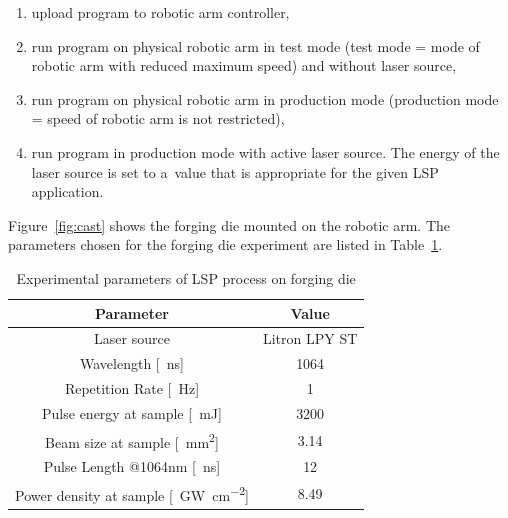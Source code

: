 \begin{enumerate}
    
\item upload program to robotic arm controller,

\item run program on physical robotic arm in test mode (test mode = mode of robotic arm with reduced maximum speed) and without laser source,

\item run program on physical robotic arm in production mode (production mode = speed of robotic arm is not restricted),

\item run program in production mode with active laser source. The energy of the laser source is set to a~value that is appropriate for the given LSP application. 

\end{enumerate}
Figure~\ref{fig:cast} shows the forging die mounted on the robotic arm. The parameters chosen for the forging die experiment are listed in Table~\ref{experimental_forging}. 

\begin{table}[h!]
\centering
    \begin{threeparttable}
        \begin{tabular}{|c | c|} 
        \hline
            \textbf{Parameter} & \textbf{Value} \\ [0.5ex] 
        \hline
        Laser source & Litron LPY ST  \\
        \hline
        Wavelength [\SI{}{\nano\second}] & 1064 \\
        \hline
        Repetition Rate [\SI{}{\hertz}] & 1  \\ 
        \hline
            Pulse energy at sample [\SI{}{\milli\joule}] & 3200 \\
        \hline
            Beam size at sample [\SI{}{\mm\squared}] & 3.14 \\
        \hline
            Pulse Length @1064nm [\SI{}{\nano\second}] & 12 \\
        \hline
            Power density at sample [\SI{}{\giga\watt\per\cm\squared}] & 8.49 \\

        \hline
        \end{tabular}

        \caption{Experimental parameters of LSP process on forging die}
        \label{experimental_forging}
    \end{threeparttable}
\end{table}

